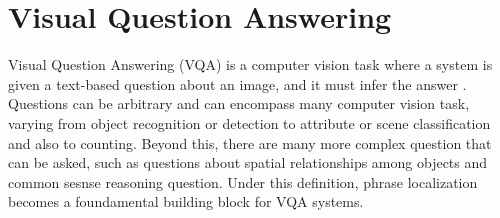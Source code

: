 \section{Visual Question Answering}

Visual Question Answering (VQA) is a computer vision task where a
system is given a text-based question about an image, and it must
infer the answer \cite{kafle2017visual}. Questions can be arbitrary
and can encompass many computer vision task, varying from object
recognition or detection to attribute or scene classification and also
to counting. Beyond this, there are many more complex question that
can be asked, such as questions about spatial relationships among
objects and common sesnse reasoning question. Under this definition,
phrase localization becomes a foundamental building block for VQA
systems.
